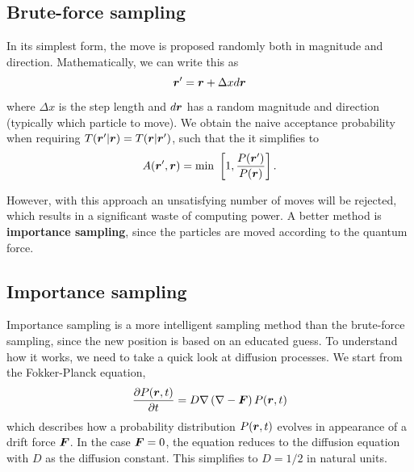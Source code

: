\subsection{Brute-force sampling}
In its simplest form, the move is proposed randomly both in magnitude and direction. Mathematically, we can write this as
\begin{equation}
\boldsymbol{{r}}'=\boldsymbol{{r}}+\Delta xd\boldsymbol{{r}}
\end{equation}
where $\Delta x$ is the step length and $d\boldsymbol{{r}}$ has a random magnitude and direction (typically which particle to move). We obtain the naive acceptance probability when requiring $T(\boldsymbol{{r}}'|\boldsymbol{{r}})=T(\boldsymbol{{r}}|\boldsymbol{{r}}')$, such that the it simplifies to
\begin{equation}
A(\boldsymbol{{r}}',\boldsymbol{{r}})=\text{min }\left[1,\frac{P(\boldsymbol{{r}}')}{P(\boldsymbol{{r}})}\right].
\end{equation}

However, with this approach an unsatisfying number of moves will be rejected, which results in a significant waste of computing power. A better method is \textbf{importance sampling}, since the particles are moved according to the quantum force. 

\subsection{Importance sampling} \label{sec:importancesampling}
Importance sampling is a more intelligent sampling method than the brute-force sampling, since the new position is based on an educated guess. To understand how it works, we need to take a quick look at diffusion processes. We start from the Fokker-Planck equation,
\begin{equation}
\frac{\partial P(\boldsymbol{{r}},t)}{\partial t}=D\nabla\left(\nabla-\boldsymbol{{F}}\right)P(\boldsymbol{{r}},t)
\end{equation}
which describes how a probability distribution $P(\boldsymbol{{r}},t)$ evolves in appearance of a drift force $\boldsymbol{{F}}$. In the case $\boldsymbol{{F}}=0$, the equation reduces to the diffusion equation with $D$ as the diffusion constant. This simplifies to $D=1/2$ in natural units. 

